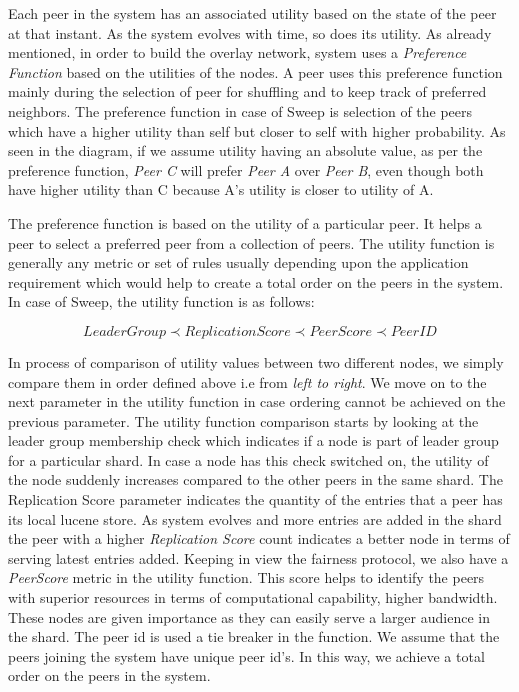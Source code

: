 \documentclass[12pt,a4paper,twoside,openright]{book}
\begin{document}
Each peer in the system has an associated utility based on the state of the peer at that instant. As the system evolves with time, so does its utility. As already mentioned, in order to build the overlay network, system uses a \textit {Preference Function} based on the utilities of the nodes. A peer uses this preference function mainly during the selection of peer for shuffling and to keep track of preferred neighbors. The preference function in case of  Sweep is selection of the peers which have a higher utility than self but closer to self with higher probability. As seen in the diagram, if we assume utility having an absolute value, as per the preference function, \textit{Peer C} will prefer \textit{Peer A} over \textit{Peer B}, even though both have higher utility than C because A's utility is closer to utility of A.

\par The preference function is based on the utility of a particular peer. It helps a peer to select a preferred peer from a collection of peers. The utility function is generally any metric or set of rules usually depending upon the application requirement which would help to create a total order on the peers in the system. In case of Sweep, the utility function is as follows:

\small 
\begin{equation*}
    LeaderGroup \prec ReplicationScore \prec PeerScore \prec PeerID
\end{equation*}
\normalsize

In process of comparison of utility values between two different nodes, we simply compare them in order defined above i.e from \textit {left to right}. We move on to the next parameter in the utility function in case ordering cannot be achieved on the previous parameter. The utility function comparison starts by looking at the leader group membership check which indicates if a node is part of leader group for a particular shard. In case a node has this check switched on, the utility of the node suddenly increases compared to the other peers in the same shard. The Replication Score parameter indicates the quantity of the entries that a peer has its local lucene store. As system evolves and more entries are added in the shard the peer with a higher \textit{Replication Score} count indicates a better node in terms of serving latest entries added. Keeping in view the fairness protocol, we also have a \textit{PeerScore} metric in the utility function. This score helps to identify the peers with superior resources in terms of computational capability, higher bandwidth. These nodes are given importance as they can easily serve a larger audience in the shard. The peer id is used a tie breaker in the function. We assume that the peers joining the system have unique peer id's.  In this way, we achieve a total order on the peers in the system.
\end{document}
